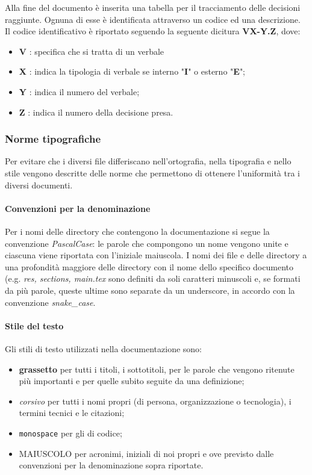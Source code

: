 Alla fine del documento è inserita una tabella per il tracciamento delle decisioni raggiunte. Ognuna di esse è identificata attraverso un codice ed una descrizione.\\
Il codice identificativo è riportato seguendo la seguente dicitura \textbf{VX-Y.Z}, dove:
\begin{itemize}
    \item\textbf{V} : specifica che si tratta di un verbale
	\item\textbf{X} : indica la tipologia di verbale se interno "\textbf{I}" o esterno "\textbf{E}";
	\item\textbf{Y} : indica il numero del verbale; %
	\item\textbf{Z} : indica il numero della decisione presa.
\end{itemize}
    
\subsubsection{Norme tipografiche} \label{_normetipografiche}
Per evitare che i diversi file differiscano nell'ortografia, nella tipografia e nello stile vengono descritte delle norme che permettono di ottenere l'uniformità tra i diversi documenti.

\paragraph{Convenzioni per la denominazione}
Per i nomi delle directory che contengono la documentazione si segue la convenzione \textit{PascalCase}: le parole che compongono un nome vengono unite e ciascuna viene riportata con l'iniziale maiuscola. I nomi dei file  e delle directory a una profondità maggiore delle directory con il nome dello specifico documento (e.g. \textit{res, sections, main.tex} sono definiti da soli caratteri minuscoli e, se formati da più parole, queste ultime sono separate da un underscore, in accordo con la convenzione \textit{snake_case}. 

\paragraph{Stile del testo}
Gli stili di testo utilizzati nella documentazione sono:
\begin{itemize}
\item\textbf{grassetto} per tutti i titoli, i sottotitoli, per le parole che vengono ritenute più importanti e per quelle subito seguite da una definizione;
\item \textit{corsivo} per tutti i nomi propri (di persona, organizzazione o tecnologia), i termini tecnici e le citazioni;
\item \texttt{monospace} per gli  di codice;
\item MAIUSCOLO per acronimi, iniziali di noi propri e ove previsto dalle convenzioni per la denominazione sopra riportate.
\end{itemize}

